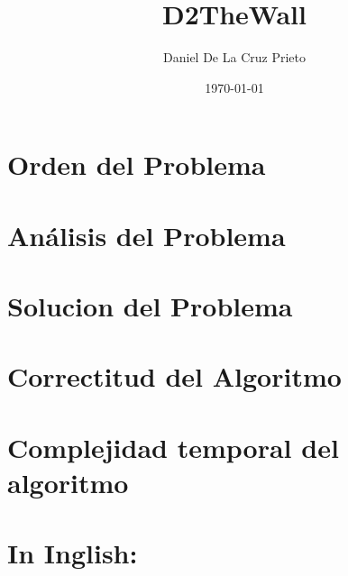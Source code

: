 \documentclass{article}
\begin{document}
    \title{D2TheWall}
    \author{Daniel De La Cruz Prieto}
    \date{\today}

    \maketitle

    \section*{Orden del Problema}
    \section{An\'alisis del Problema } 

    \section{Solucion del Problema } 
    \section{Correctitud del Algoritmo} 
    \section{Complejidad temporal del algoritmo} 

    
    \section*{In Inglish:}
    
\end{document}
